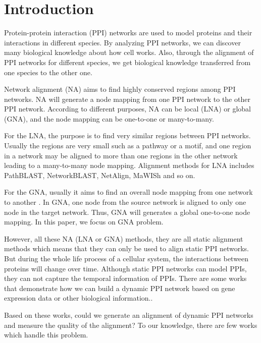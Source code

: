 \documentclass{bioinfo}
\theoremstyle{definition}
\begin{document}
\section{Introduction}

Protein-protein interaction (PPI) networks are used to model proteins and their interactions in different species. By analyzing PPI networks, we can discover many biological knowledge about how cell works. Also, through the alignment of PPI networks for different species, we get biological knowledge transferred from one species to the other one. 

Network alignment (NA) aims to find highly conserved regions among PPI networks. NA will generate a node mapping from one PPI network to the other PPI network. According to different purposes, NA can be local (LNA) or global (GNA), and the node mapping can be one-to-one or many-to-many. 

For the LNA, the purpose is to find very similar regions between PPI networks. Usually the regions are very small such as a pathway or a motif, and one region in a network may be aligned to more than one regions in the other network leading to a many-to-many node mapping. Alignment methods for LNA includes PathBLAST\citep{kelley2004pathblast}, NetworkBLAST\citep{sharan2005conserved}, NetAlign\citep{liang2006netalign}, MaWISh\citep{koyuturk2006pairwise} and so on.

For the GNA, usually it aims to find an overall node mapping from one network to another \citep{singh2008global,liao2009isorankn,kuchaiev2011integrative,malod2015graal,kuchaiev2010topological,memivsevic2012c,saraph2014magna,vijayan2015magna++,aladaug2013spinal,kazemi2016proper}. In GNA, one node from the source network is aligned to only one node in the target network. Thus, GNA will generates a global one-to-one node mapping. In this paper, we focus on GNA problem.

However, all these NA (LNA or GNA) methods, they are all static alignment methods which means that they can only be used to align static PPI networks. But during the whole life process of a cellular system, the interactions between proteins will change over time. Although static PPI networks can model PPIs, they can not capture the temporal information of PPIs. There are some works that demonstrate how we can build a dynamic PPI network based on gene expression data or other biological information.\citep{chen2014identifying,wang2013construction,zhang2016method}. 

Based on these works, could we generate an alignment of dynamic PPI networks and measure the quality of the alignment? To our knowledge, there are few works which handle this problem.
\end{document}
